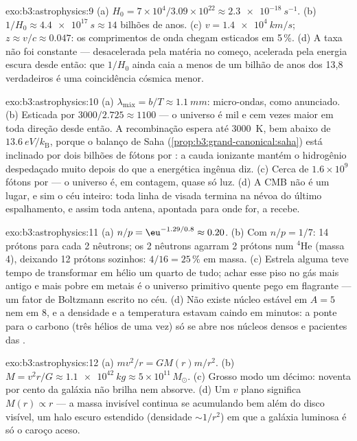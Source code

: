 \begin{solution}{exo:b3:astrophysics:9}
(a) $H_0 = 7\times10^4/3.09\times10^{22} \approx
\qty{2.3e-18}{s^{-1}}$. (b) $1/H_0 \approx \qty{4.4e17}{s}
\approx 14$ bilhões de anos. (c) $v = \qty{1.4e4}{km/s}$;
$z \approx v/c \approx 0.047$: os comprimentos de onda chegam esticados
em 5\,\%. (d) A taxa não foi constante --- desacelerada pela
matéria no começo, acelerada pela energia escura desde então: que
$1/H_0$ ainda caia a menos de um bilhão de anos dos 13,8 verdadeiros é
uma coincidência cósmica menor.
\end{solution}

\begin{solution}{exo:b3:astrophysics:10}
(a) $\lambda_{\text{máx}} = b/T \approx \qty{1.1}{mm}$:
micro-ondas, como anunciado. (b) Esticada por $3000/2.725 \approx
1100$ --- o universo é mil e cem vezes maior em toda
direção desde então. A recombinação espera até \qty{3000}{K}, bem
abaixo de $\qty{13.6}{eV}/k_{\text{B}}$, porque o balanço de Saha
(\cref{prop:b3:grand-canonical:saha}) está inclinado por dois bilhões
de fótons por : a cauda ionizante mantém o hidrogênio despedaçado
muito depois do que a energética ingênua diz. (c) Cerca de
$1.6\times10^{9}$ fótons por  --- o universo é, em
contagem, quase só luz. (d) A CMB não é um lugar, e sim
o céu inteiro: toda linha de visada termina na névoa do último
espalhamento, e assim toda antena, apontada para onde for, a recebe.
\end{solution}

\begin{solution}{exo:b3:astrophysics:11}
(a) $n/p = \eu^{-1.29/0.8} \approx 0.20$. (b) Com $n/p = 1/7$:
14 prótons para cada 2 nêutrons; os 2 nêutrons agarram 2 prótons num
$^4$He (massa 4), deixando 12 prótons sozinhos: $4/16 = 25\,\%$ em
massa. (c) Estrela alguma teve tempo de transformar em hélio um quarto
de tudo; achar esse piso no gás mais antigo e mais pobre em metais
é o universo primitivo quente pego em flagrante --- um fator de
Boltzmann escrito no céu. (d) Não existe núcleo estável
em $A = 5$ nem em $8$, e a densidade e a temperatura estavam
caindo em minutos: a ponte para o carbono (três hélios de uma
vez) só se abre nos núcleos densos e pacientes das .
\end{solution}

\begin{solution}{exo:b3:astrophysics:12}
(a) $mv^2/r = GM(r)m/r^2$. (b) $M = v^2r/G \approx
\qty{1.1e42}{kg} \approx 5\times10^{11}\,M_\odot$. (c) Grosso modo
um décimo: noventa por cento da galáxia não brilha nem
absorve. (d) Um $v$ plano significa $M(r) \propto r$ --- a massa
invisível continua se acumulando bem além do disco visível, um
halo escuro estendido (densidade $\sim1/r^2$) em que a galáxia
luminosa é só o caroço aceso.
\end{solution}

